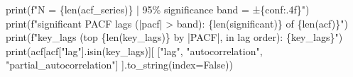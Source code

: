 \documentclass[
  english,
  letterpaper,
]{scrbook}
\newenvironment{Shaded}{\begin{snugshade}}{\end{snugshade}}
\newcommand{\BuiltInTok}[1]{\textcolor[rgb]{0.00,0.23,0.31}{#1}}
\newcommand{\NormalTok}[1]{\textcolor[rgb]{0.00,0.23,0.31}{#1}}
\newcommand{\OperatorTok}[1]{\textcolor[rgb]{0.37,0.37,0.37}{#1}}
\newcommand{\SpecialCharTok}[1]{\textcolor[rgb]{0.37,0.37,0.37}{#1}}
\newcommand{\SpecialStringTok}[1]{\textcolor[rgb]{0.13,0.47,0.30}{#1}}
\newcommand{\StringTok}[1]{\textcolor[rgb]{0.13,0.47,0.30}{#1}}
\newcommand{\VariableTok}[1]{\textcolor[rgb]{0.07,0.07,0.07}{#1}}
\begin{document}
\begin{Shaded}
\begin{Highlighting}[]
\BuiltInTok{print}\NormalTok{(}\SpecialStringTok{f"N = }\SpecialCharTok{\{}\BuiltInTok{len}\NormalTok{(acf\_series)}\SpecialCharTok{\}}\SpecialStringTok{  |  95\% significance band = ±}\SpecialCharTok{\{}\NormalTok{conf}\SpecialCharTok{:.4f\}}\SpecialStringTok{"}\NormalTok{)}
\BuiltInTok{print}\NormalTok{(}\SpecialStringTok{f"significant PACF lags (|pacf| \textgreater{} band): }\SpecialCharTok{\{}\BuiltInTok{len}\NormalTok{(significant)}\SpecialCharTok{\}}\SpecialStringTok{ of }\SpecialCharTok{\{}\BuiltInTok{len}\NormalTok{(acf)}\SpecialCharTok{\}}\SpecialStringTok{"}\NormalTok{)}
\BuiltInTok{print}\NormalTok{(}\SpecialStringTok{f"key\_lags (top }\SpecialCharTok{\{}\BuiltInTok{len}\NormalTok{(key\_lags)}\SpecialCharTok{\}}\SpecialStringTok{ by |PACF|, in lag order): }\SpecialCharTok{\{}\NormalTok{key\_lags}\SpecialCharTok{\}}\SpecialStringTok{"}\NormalTok{)}
\BuiltInTok{print}\NormalTok{(acf[acf[}\StringTok{"lag"}\NormalTok{].isin(key\_lags)][}
\NormalTok{    [}\StringTok{"lag"}\NormalTok{, }\StringTok{"autocorrelation"}\NormalTok{, }\StringTok{"partial\_autocorrelation"}\NormalTok{]}
\NormalTok{].to\_string(index}\OperatorTok{=}\VariableTok{False}\NormalTok{))}


\end{Highlighting}
\end{Shaded}
\end{document}
